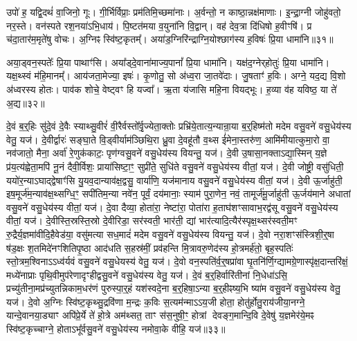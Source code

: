 उपो॑ ह॒ यद्वि॒दथं॑ वा॒जिनो॒ गूः।
गी॒र्भिर्विप्राः॒ प्रम॑तिमि॒च्छमा॑नाः।
अ॒र्वन्तो॒ न काष्ठा॒न्नक्ष॑माणाः।
इ॒न्द्रा॒ग्नी जोहु॑वतो॒ नर॒स्ते।
वन॑स्पते रश॒नया॑\-ऽभि॒धाय॑।
पि॒ष्टत॑मया व॒युना॑नि वि॒द्वान्।
वह॑ देव॒त्रा दि॑धिषो ह॒वीꣳषि॑।
प्र च॑दा॒तार॑म॒मृते॑षु वोचः।
अ॒ग्निꣴ स्वि॑ष्ट॒कृतम्᳚।
अया॑ड॒ग्निरि॑न्द्राग्नि॒योश्छाग॑स्य ह॒विषः॑ प्रि॒या धामा॑नि॥३१॥

अया॒ड्वन॒स्पतेः᳚ प्रि॒या पाथाꣳ॑सि।
अया᳚ड्दे॒वाना॑माज्य॒पानां᳚ प्रि॒या धामा॑नि।
यक्ष॑द॒ग्नेर्‌\mbox{}होतुः॑ प्रि॒या धामा॑नि।
यक्ष॒थ्स्वं म॑हि॒मानम्᳚।
आय॑जता॒मेज्या॒ इषः॑।
कृ॒णोतु॒ सो अ॑ध्व॒रा जा॒तवे॑दाः।
जु॒षताꣳ॑ ह॒विः।
अग्ने॒ यद॒द्य वि॒शो अ॑ध्वरस्य होतः।
पाव॑क शोचे॒ वेष्ट्वꣳ हि यज्वा᳚।
ऋ॒ता य॑जासि महि॒ना वियद्भूः।
ह॒व्या व॑ह यविष्ठ॒ या ते॑ अ॒द्य॥३२॥\anuvakamend[धामा॑नि॒ भूरेकं॑ च]

दे॒वं ब॒र्॒हिः सु॑दे॒वं दे॒वैः स्याथ्सु॒वीरं॑ वी॒रैर्वस्तो᳚र्वृ॒ज्येता॒क्तोः प्रभ्रि॑ये॒तात्य॒न्यान्रा॒या ब॒र्॒हिष्म॑तो मदेम वसु॒वने॑ वसु॒धेय॑स्य वेतु॒ यज॑।
दे॒वीर्द्वारः॑ सङ्घा॒ते वि॒ड्वीर्याम॑ञ्छिथि॒रा ध्रु॒वा दे॒वहू॑तौ व॒थ्स ई॑मेना॒स्तरु॑ण॒ आमि॑मीयात्कुमा॒रो वा॒ नव॑जातो॒ मैना॒ अर्वा॑ रे॒णुक॑काटः॒ पृण॑ग्वसु॒वने॑ वसु॒धेय॑स्य वियन्तु॒ यज॑।
दे॒वी उ॒षासा॒नक्ता\-ऽद्या॒स्मिन्‌ य॒ज्ञे प्र॑य॒त्य॑ह्वेता॒मपि॑ नू॒नं दैवी॒र्विशः॒ प्राया॑सिष्टा॒ꣳ॒ सुप्री॑ते॒ सुधि॑ते वसु॒वने॑ वसु॒धेय॑स्य वीतां॒ यज॑।
दे॒वी जोष्ट्री॒ वसु॑धिती॒ ययो॑र॒न्या\-ऽघाद्द्वेषाꣳ॑सि यु॒यव॒दान्याव॑क्ष॒द्वसु॒ वार्या॑णि॒ यज॑मानाय वसु॒वने॑ वसु॒धेय॑स्य वीतां॒ यज॑।
दे॒वी ऊ॒र्जाहु॑ती॒ इष॒मूर्ज॑म॒न्याव॑क्ष॒थ्सग्धि॒ꣳ॒ सपी॑तिम॒न्या नवे॑न॒ पूर्वं॒ दय॑मानाः॒ स्याम॑ पुरा॒णेन॒ नवं॒ तामूर्ज॑मू॒र्जाहु॑ती ऊ॒र्जय॑माने अधातां वसु॒वने॑ वसु॒धेय॑स्य वीतां॒ यज॑।
दे॒वा दैव्या॒ होता॑रा॒ नेष्टा॑रा॒ पोता॑रा ह॒ताघ॑शꣳसावाभ॒रद्व॑सू वसु॒वने॑ वसु॒धेय॑स्य वीतां॒ यज॑।
दे॒वीस्ति॒स्रस्ति॒स्रो दे॒वीरिडा॒ सर॑स्वती॒ भार॑ती॒ द्यां भार॑त्यादि॒त्यैर॑स्पृक्ष॒थ्सर॑स्वती॒मꣳ रु॒द्रैर्य॒ज्ञमा॑वीदि॒हैवेड॑या॒ वसु॑मत्या सध॒मादं॑ मदेम वसु॒वने॑ वसु॒धेय॑स्य वियन्तु॒ यज॑।
दे॒वो नरा॒शꣳस॑स्त्रिशी॒र्॒षा ष॑ड॒क्षः श॒तमिदे॑नꣳशितिपृ॒ष्ठा आद॑धति स॒हस्र॑मीं॒ प्रव॑हन्ति मि॒त्रावरु॒णेद॑स्य हो॒त्रमर्\mbox{}ह॑तो॒ बृह॒स्पतिः॑ स्तो॒त्रम॒श्विना\-ऽऽध्व॑र्यवं वसु॒वने॑ वसु॒धेयस्य॑ वेतु॒ यज॑।
दे॒वो वन॒स्पति॑र्व॒र्॒षप्रा॑वा घृ॒तनि॑र्णि॒ग्द्यामग्रे॒णास्पृ॑क्ष॒दान्तरि॑क्षं॒ मध्ये॑नाप्राः पृथि॒वीमुप॑रेणादृꣳहीद्वसु॒वने॑ वसु॒धेय॑स्य वेतु॒ यज॑।
दे॒वं ब॒र्॒हिर्वारि॑तीनां नि॒धेधा॑ऽसि॒ प्रच्यु॑तीना॒मप्र॑\-च्युतन्निकाम॒धर॑णं पुरुस्पा॒र्॒हं यश॑स्वदे॒ना ब॒र्॒हिषा॒\-ऽन्या ब॒र्॒हीꣴष्य॒भि ष्या॑म वसु॒वने॑ वसु॒धेय॑स्य वेतु॒ यज॑।
दे॒वो अ॒ग्निः स्वि॑ष्ट॒कृथ्सु॒द्रवि॑णा म॒न्द्रः क॒विः स॒त्यम॑न्मा\-ऽऽय॒जी होता॒ होतु॑र्\mbox{}होतु॒राय॑जीया॒नग्ने॒ यान्दे॒वानया॒ड्याꣳ अपि॑प्रे॒र्ये ते॑ हो॒त्रे अम॑थ्सत॒ ताꣳ स॑स॒नुषी॒ꣳ॒ होत्रां देवङ्ग॒मान्दि॒वि दे॒वेषु॑ य॒ज्ञमेर॑ये॒मꣴ स्वि॑ष्ट॒कृच्चाग्ने॒ होता\-ऽभू᳚र्वसु॒वने॑ वसु॒धेय॑स्य नमोवा॒के वीहि॒ यज॑॥३३॥\anuvakamend[यजैकं॑ च]

